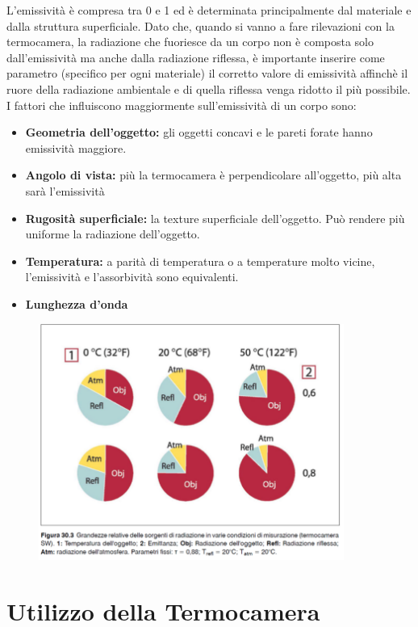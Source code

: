L'emissività è compresa tra 0 e 1 ed è determinata principalmente dal materiale
e dalla struttura superficiale.
Dato che, quando si vanno a fare rilevazioni con la termocamera, la radiazione
che fuoriesce da un corpo non è composta solo dall'emissività ma anche dalla radiazione
riflessa, è importante inserire come parametro (specifico per ogni materiale) il corretto valore di emissività
affinchè il ruore della radiazione ambientale e di quella riflessa venga ridotto il
più possibile.\\

I fattori che influiscono maggiormente sull'emissività di un corpo sono:

\begin{itemize}
    \item \textbf{Geometria dell'oggetto:} gli oggetti concavi e le pareti forate hanno
          emissività maggiore.
    \item \textbf{Angolo di vista:} più la termocamera è perpendicolare all'oggetto, più
          alta sarà l'emissività
    \item \textbf{Rugosità superficiale:} la texture superficiale dell'oggetto. Può rendere più
          uniforme la radiazione dell'oggetto.
    \item \textbf{Temperatura:} a parità di temperatura o a temperature molto vicine,
          l'emissività e l'assorbività sono equivalenti.
    \item \textbf{Lunghezza d'onda}
\end{itemize}

\begin{figure}[H]
    \centering
    \includegraphics[width=10cm, keepaspectratio]{capitoli/immagini/imgs/temptemp.png}
\end{figure}

\section{Utilizzo della Termocamera}

